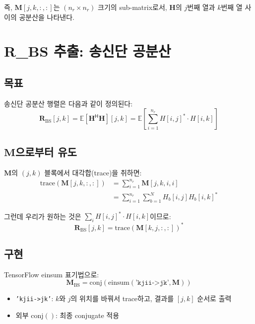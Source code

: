 \documentclass[10pt]{article}
\begin{document}
즉, $\mathbf{M}[j,k,:,:]$는 $(n_r \times n_r)$ 크기의 sub-matrix로서, $\mathbf{H}$의 $j$번째 열과 $k$번째 열 사이의 공분산을 나타낸다.

\section{R\_BS 추출: 송신단 공분산}

\subsection{목표}

송신단 공분산 행렬은 다음과 같이 정의된다:
\begin{equation}
\mathbf{R}_{\text{BS}}[j,k] = \mathbb{E}\left[\mathbf{H}^{\mathsf{H}} \mathbf{H}\right][j,k] = \mathbb{E}\left[\sum_{i=1}^{n_r} H[i,j]^* \cdot H[i,k]\right]
\end{equation}

\subsection{$\mathbf{M}$으로부터 유도}

$\mathbf{M}$의 $(j,k)$ 블록에서 대각합(trace)을 취하면:
\begin{align}
\text{trace}(\mathbf{M}[j,k,:,:]) &= \sum_{i=1}^{n_r} \mathbf{M}[j,k,i,i] \\
&= \sum_{i=1}^{n_r} \sum_{b=1}^{N} H_b[i,j] H_b[i,k]^*
\end{align}

그런데 우리가 원하는 것은 $\sum_i H[i,j]^* \cdot H[i,k]$이므로:
\begin{equation}
\mathbf{R}_{\text{BS}}[j,k] = \text{trace}(\mathbf{M}[k,j,:,:])^*
\end{equation}

\subsection{구현}

TensorFlow einsum 표기법으로:
\begin{equation}
\boxed{\mathbf{M}_{\text{BS}} = \text{conj}\left(\text{einsum}(\texttt{'kjii->jk'}, \mathbf{M})\right)}
\end{equation}

\begin{itemize}
    \item \texttt{'kjii->jk'}: $k$와 $j$의 위치를 바꿔서 trace하고, 결과를 $[j,k]$ 순서로 출력
    \item 외부 $\text{conj}()$: 최종 conjugate 적용
\end{itemize}
\end{document}
